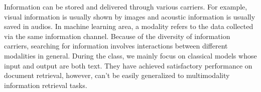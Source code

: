 \documentclass{article}
\begin{document}



\printAffiliationsAndNotice{}  %
Information can be stored and delivered through various carriers. For example, visual information is usually shown by images and acoustic information is usually saved in audios. In machine learning area, a modality refers to the data collected via the same information channel. Because of the diversity of information carriers, searching for information involves interactions between different modalities in general. During the class, we mainly focus on classical models whose input and output are both text. They have achieved satisfactory performance on document retrieval, however, can't be easily generalized to multimodality information retrieval tasks.
\end{document}
